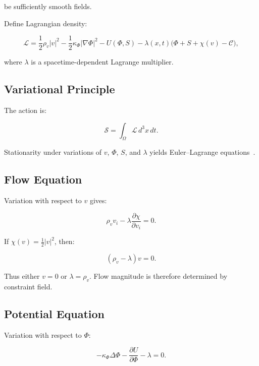 \documentclass[12pt,a4paper]{article}
\theoremstyle{definition}
\begin{document}
be sufficiently smooth fields.

Define Lagrangian density:

\begin{equation}
  \mathcal{L}
  =
  \frac{1}{2}\rho_v |v|^2
  - \frac{1}{2}\kappa_\Phi |\nabla \Phi|^2
  - U(\Phi,S)
  - \lambda(x,t)\big(\Phi + S + \chi(v) - \mathcal{C}\big),
  \label{eq:Ldensity}
\end{equation}

where $\lambda$ is a spacetime-dependent Lagrange multiplier.

\subsection{Variational Principle}

The action is:

\begin{equation}
  \mathcal{S}
  =
  \int_\Omega \mathcal{L}\, d^3x\,dt.
\end{equation}

Stationarity under variations of $v$, $\Phi$, $S$, and $\lambda$
yields Euler–Lagrange equations~\citep{evans2010}.

\subsection{Flow Equation}

Variation with respect to $v$ gives:

\begin{equation}
  \rho_v v_i
  - \lambda \frac{\partial \chi}{\partial v_i}
  = 0.
\end{equation}

If $\chi(v) = \frac{1}{2}|v|^2$,
then:

\begin{equation}
  (\rho_v - \lambda) v = 0.
\end{equation}

Thus either $v=0$ or $\lambda = \rho_v$.
Flow magnitude is therefore determined by constraint field.

\subsection{Potential Equation}

Variation with respect to $\Phi$:

\begin{equation}
  -\kappa_\Phi \Delta \Phi
  - \frac{\partial U}{\partial \Phi}
  - \lambda
  = 0.
  \label{eq:EL_phi_correct}
\end{equation}
\end{document}
